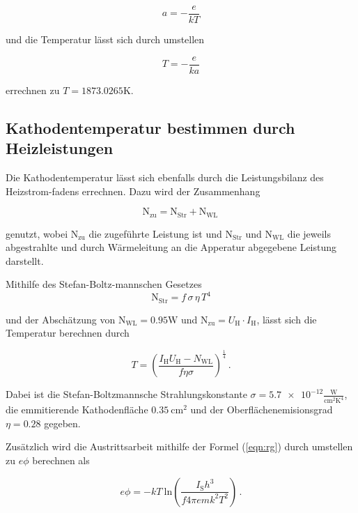 \begin{equation*}
      a = - \frac{e}{kT} 
\end{equation*}

und die Temperatur lässt sich durch umstellen 

\begin{equation*}
    T = - \frac{e}{ka} 
\end{equation*}

errechnen zu $ T = 1873.0265 \si{\kelvin}$.

\subsection{Kathodentemperatur bestimmen durch Heizleistungen}
Die Kathodentemperatur lässt sich ebenfalls durch die Leistungsbilanz des Heizstrom-fadens errechnen. Dazu wird der Zusammenhang

\begin{equation}
    \label{eqn:zu}
    \text{N}_\text{zu} = \text{N}_\text{Str} + \text{N}_\text{WL} \,
\end{equation}

genutzt, wobei $\text{N}_\text{zu}$ die zugeführte Leistung ist und $\text{N}_\text{Str}$ und $\text{N}_\text{WL}$ die jeweils abgestrahlte und durch Wärmeleitung an die Apperatur abgegebene Leistung
darstellt.

Mithilfe des Stefan-Boltz-mannschen Gesetzes
\begin{equation*}
    \text{N}_\text{Str} = f \, \sigma \, \eta \, T^4
\end{equation*}

und der Abschätzung von $\text{N}_\text{WL} = 0.95 \si{\watt}$ und $\text{N}_\text{zu} = U_\text{H} \cdot I_\text{H}$, lässt sich die Temperatur berechnen durch

\begin{equation}
    T = \left( \frac{I_\text{H} U_\text{H} - N_\text{WL}}{f \eta \sigma} \right)^{\frac{1}{4}} \, .
    \label{eqn:temp}
\end{equation}

Dabei ist die Stefan-Boltzmannsche Strahlungskonstante $\sigma = \num{5.7e-12}\frac{\text{W}}{\text{cm}^2\text{K}^4}$, die emmitierende Kathodenfläche
$\SI{0.35}{\centi\meter\squared}$ und der Oberflächenemisionsgrad $\eta = \num{0.28}$ gegeben.

Zusätzlich wird die Austrittsarbeit mithilfe der Formel (\ref{eqn:rg}) durch umstellen zu $ e \phi$ berechnen als

\begin{equation}
    e \phi = -k T \: \text{ln} \left( \frac{I_\text{S} h^3}{f 4 \pi e m k^2 T^2} \right) \, .
    \label{eqn:ephi}
\end{equation}

